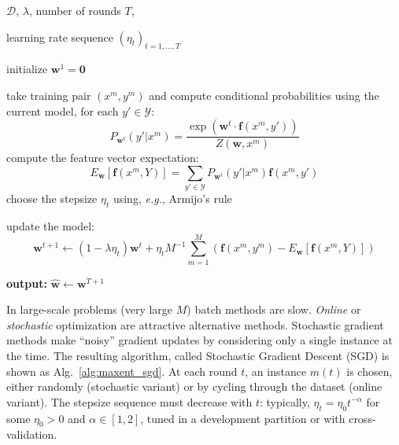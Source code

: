 \begin{algorithm}[t]

   \caption{Batch Gradient Descent for Maximum Entropy \label{alg:maxent_gd}}

\begin{algorithmic}[1]

    $\mathcal{D}$, $\lambda$, number of rounds $T$,

   learning rate sequence $(\eta_t)_{t = 1,\ldots,T}$

   \STATE initialize $\boldsymbol{w}^1 = \mathbf{0}$

	\STATE take training pair $(x^m, y^m)$ and compute conditional probabilities using the current model, for each $y' \in \mathcal{Y}$:
	$$P_{\boldsymbol{w}^t}(y'|x^m) = \frac{\exp(\boldsymbol{w}^t \cdot \boldsymbol{f}(x^m,y'))}{Z(\boldsymbol{w},x^m)}$$ 
	\STATE compute the feature vector expectation:  
	$$E_{\boldsymbol{w}}[\boldsymbol{f}(x^m,Y)] = \sum_{y' \in \mathcal{Y}} P_{\boldsymbol{w}^t}(y'|x^m) \boldsymbol{f}(x^m,y')$$
	\ENDFOR
	\STATE choose the stepsize $\eta_t$ using, \emph{e.g.}, Armijo's rule

	\STATE update the model: 
	$$\boldsymbol{w}^{t+1} \leftarrow (1-\lambda \eta_t) \boldsymbol{w}^{t} + \eta_t M^{-1} \sum_{m=1}^M \left( \boldsymbol{f}(x^{m},y^{m}) 
	- E_{\boldsymbol{w}}[\boldsymbol{f}(x^{m},Y)]\right)$$
	\ENDFOR

   \STATE \textbf{output:} $\hat{\boldsymbol{w}} \leftarrow \boldsymbol{w}^{T+1}$

\end{algorithmic}

\end{algorithm}

 

In large-scale problems (very large $M$) batch methods are slow. 
\emph{Online} or \emph{stochastic} optimization are attractive alternative methods. Stochastic gradient methods make ``noisy'' gradient updates 
by considering only a single instance at the time. The resulting algorithm, called Stochastic Gradient Descent (SGD) is shown as Alg.~\ref{alg:maxent_sgd}. 
At each round $t$, an instance $m(t)$ is chosen, either randomly  (stochastic variant) or by cycling through the dataset (online variant). 
The stepsize sequence must decrease with $t$: typically, $\eta_t = \eta_0 t^{-\alpha}$ for some $\eta_0 > 0$ and $\alpha \in [1, 2]$, tuned 
in a development partition or with cross-validation. 

